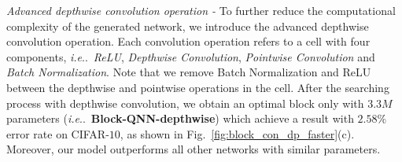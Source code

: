 \documentclass[10pt,journal,compsoc]{IEEEtran}
\makeatletter
\DeclareRobustCommand\onedot{\futurelet\@let@token\@onedot}
\def\@onedot{\ifx\@let@token.\else.\null\fi\xspace}
\def\ie{\emph{i.e}\onedot} \def\Ie{\emph{I.e}\onedot}
\makeatother
\begin{document}
\vspace{0.1cm} \noindent \textit{Advanced depthwise convolution operation -}
To further reduce the computational complexity of the generated network, we introduce the	advanced depthwise convolution operation. Each convolution operation refers to a cell with four components,  \ie~\textit{ReLU}, \textit{Depthwise Convolution}, \textit{Pointwise Convolution} and \textit{Batch Normalization}. Note that we remove 
Batch Normalization and ReLU between the depthwise and pointwise operations in the cell. After the searching process with depthwise convolution, we obtain an optimal block only with $3.3M$ parameters (\ie~\textbf{Block-QNN-depthwise}) which achieve a result with $2.58\%$ error rate on CIFAR-$10$, as shown in Fig.~\ref{fig:block_con_dp_faster}(c). Moreover, our model outperforms all other networks with similar parameters.
\end{document}
